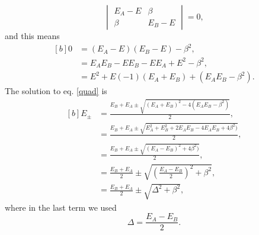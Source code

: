 \begin{questions}
\begin{solution}
\begin{equation}
\begin{vmatrix}
    E_A - E & \beta \\
    \beta & E_B - E
  \end{vmatrix} = 0,
  \label{2:det}
\end{equation}
and this means
\begin{equation}
  \begin{aligned}[b]
    0&=(E_A - E)(E_B - E) - \beta^2,\\
     &=E_AE_B - EE_B - EE_A + E^2 - \beta^2,\\
     &=E^2 + E(-1)(E_A + E_B) + (E_AE_B - \beta^2).
    \label{quad}
  \end{aligned}
\end{equation}
The solution to eq. \ref{quad} is
\begin{equation}
  \begin{aligned}[b]
    E_\pm &= \frac{E_B + E_A \pm \sqrt{(E_A + E_B)^2 - 4(E_AE_B - \beta^2)}}{2},\\
    &= \frac{E_B + E_A \pm \sqrt{E_A^2 + E_B^2 + 2E_AE_B - 4E_AE_B + 4\beta^2)}}{2},\\
    &= \frac{E_B + E_A \pm \sqrt{(E_A - E_B)^2 + 4\beta^2)}}{2},\\
    &= \frac{E_B + E_A}{2}\pm \sqrt{\left(\frac{E_A - E_B}{2}\right)^2 + \beta^2},\\
    &= \frac{E_B + E_A}{2}\pm \sqrt{\Delta^2 + \beta^2},
  \end{aligned}
\end{equation}
where in the last term we used
\begin{equation}
  \Delta = \frac{E_A - E_B}{2}.
\end{equation}
\end{solution}
\end{questions}
